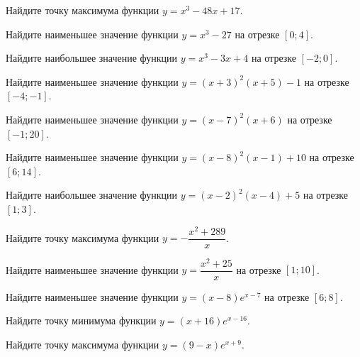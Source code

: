 \begin{class}[number=3]
	\begin{listofex}
		\item Найдите точку максимума функции \( y=x^3-48x+17 \).
		\item Найдите наименьшее значение функции \( y=x^3-27 \) на отрезке \([0;4]\).
		\item Найдите наибольшее значение функции \( y=x^3-3x+4 \) на отрезке \([-2;0]\).
		\item Найдите наименьшее значение функции \( y=(x+3)^2(x+5)-1 \) на отрезке \([-4;-1]\).
		\item Найдите наименьшее значение функции \( y=(x-7)^2(x+6) \) на отрезке \([-1;20]\).
		\item Найдите наименьшее значение функции \( y=(x-8)^2(x-1)+10 \) на отрезке \([6;14]\).
		\item Найдите наибольшее значение функции \( y=(x-2)^2(x-4)+5 \) на отрезке \([1;3]\).
		\item Найдите точку максимума функции \( y=-\dfrac{ x^2+289 }{ x } \).
		\item Найдите наименьшее значение функции \( y=\dfrac{x^2+25  }{ x } \) на отрезке \([1;10]\).
		\item Найдите наименьшее значение функции \( y=(x-8)e^{x-7} \) на отрезке \([6;8]\).
		\item Найдите точку минимума функции \( y=(x+16)e^{x-16} \).
		\item Найдите точку максимума функции \( y=(9-x)e^{x+9} \).
		

\end{listofex}
\end{class}
